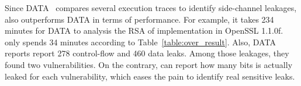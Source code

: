 Since DATA~\cite{217537} compares several execution traces to identify
side-channel leakages, \tool{} also outperforms DATA in terms of performance.
For example, it takes 234 minutes for DATA to analysis the RSA of implementation
in OpenSSL 1.1.0f. \tool{} only spends 34 minutes according to Table~\ref{table:over_result}.
Also, DATA reports report 278 control-flow and 460 data leaks. Among those leakages,
they found two vulnerabilities. On the contrary, \tool{} can report how many bits is
actually leaked for each vulnerability, which eases the pain to identify real sensitive leaks.

\begin{table}[]
    \caption{Comparison with CacheD}
    \label{eval:cacheD}
\end{table}

